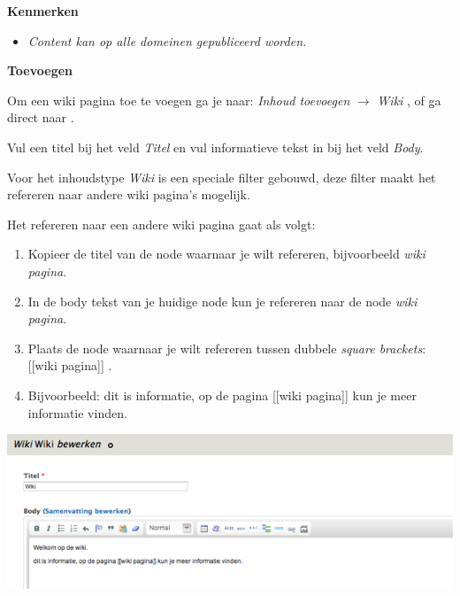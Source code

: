 \textbf{Kenmerken}

\begin{itemize}
\item \emph{Content kan op alle domeinen gepubliceerd worden.}
\end{itemize}

\textbf{Toevoegen}

Om een wiki pagina toe te voegen ga je naar: \emph{Inhoud toevoegen} $\rightarrow$ \emph{Wiki} , of ga direct naar .

Vul een titel bij het veld \emph{Titel} en vul informatieve tekst in bij het veld \emph{Body}.

Voor het inhoudstype \emph{Wiki} is een speciale filter gebouwd, deze filter maakt het refereren naar andere wiki pagina's mogelijk. 

Het refereren naar een andere wiki pagina gaat als volgt: 

\begin{enumerate}
\item Kopieer de titel van de node waarnaar je wilt refereren, bijvoorbeeld \emph{wiki pagina}.
\item In de body tekst van je huidige node kun je refereren naar de node \emph{wiki pagina}.
\item Plaats de node waarnaar je wilt refereren tussen dubbele \emph{square brackets}: [[wiki pagina]] .
\item Bijvoorbeeld: dit is informatie, op de pagina [[wiki pagina]] kun je meer informatie vinden.
\end{enumerate}

\bigskip

\begin{center}
	\includegraphics[width=\textwidth]{img/wiki.png}
\end{center}